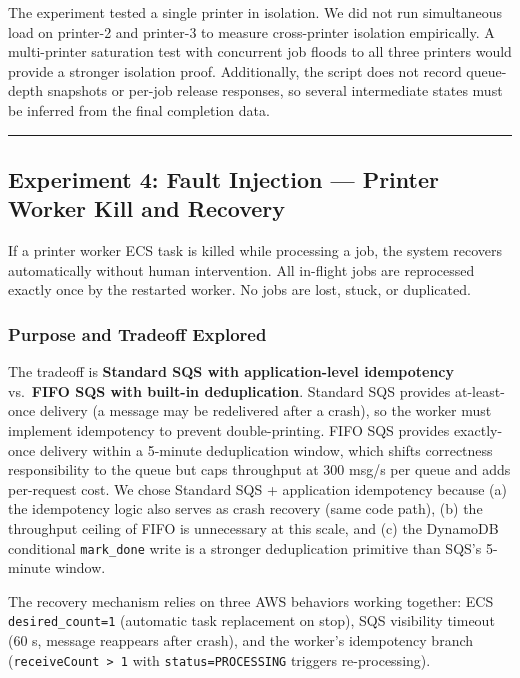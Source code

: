 \documentclass[11pt,letterpaper]{article}
\newcommand{\code}[1]{\texttt{\small #1}}
\begin{document}
\begin{limitbox}
The experiment tested a single printer in isolation. We did not run simultaneous load on printer-2 and printer-3 to measure cross-printer isolation empirically. A multi-printer saturation test with concurrent job floods to all three printers would provide a stronger isolation proof. Additionally, the script does not record queue-depth snapshots or per-job release responses, so several intermediate states must be inferred from the final completion data.
\end{limitbox}

\medskip\hrule\medskip

\subsection{Experiment 4: Fault Injection --- Printer Worker Kill and Recovery}
\label{sec:exp4}

\begin{claimbox}
If a printer worker ECS task is killed while processing a job, the system recovers automatically without human intervention. All in-flight jobs are reprocessed exactly once by the restarted worker. No jobs are lost, stuck, or duplicated.
\end{claimbox}

\subsubsection{Purpose and Tradeoff Explored}
The tradeoff is \textbf{Standard SQS with application-level idempotency} vs.\ \textbf{FIFO SQS with built-in deduplication}. Standard SQS provides at-least-once delivery (a message may be redelivered after a crash), so the worker must implement idempotency to prevent double-printing. FIFO SQS provides exactly-once delivery within a 5-minute deduplication window, which shifts correctness responsibility to the queue but caps throughput at 300 msg/s per queue and adds per-request cost. We chose Standard SQS + application idempotency because (a) the idempotency logic also serves as crash recovery (same code path), (b) the throughput ceiling of FIFO is unnecessary at this scale, and (c) the DynamoDB conditional \code{mark\_done} write is a stronger deduplication primitive than SQS's 5-minute window.

The recovery mechanism relies on three AWS behaviors working together: ECS \code{desired\_count=1} (automatic task replacement on stop), SQS visibility timeout (60 s, message reappears after crash), and the worker's idempotency branch (\code{receiveCount > 1} with \code{status=PROCESSING} triggers re-processing).
\end{document}
